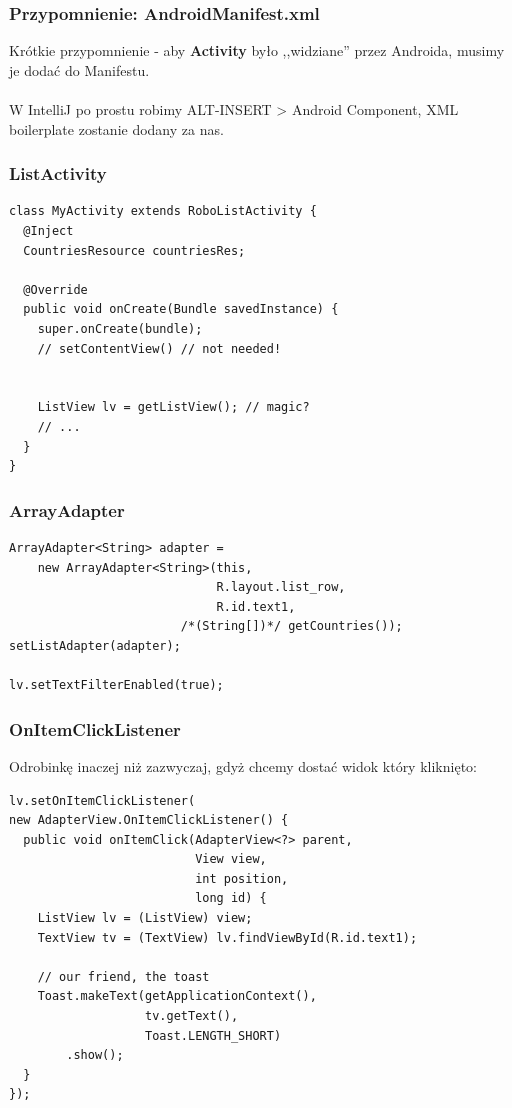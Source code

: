 \documentclass{beamer}
\begin{document}
\begin{frame}\frametitle{Przypomnienie: AndroidManifest.xml}
\begin{center}
Krótkie przypomnienie - aby \textbf{Activity} było ,,widziane'' 
przez Androida, musimy je dodać do Manifestu.
\ \\ 
\ \\ 
\small{W IntelliJ po prostu robimy ALT-INSERT > Android Component, 
XML boilerplate zostanie dodany za nas.}
\end{center}
\end{frame}

\begin{frame}[fragile]\frametitle{ListActivity}
\begin{lstlisting}
class MyActivity extends RoboListActivity {
  @Inject
  CountriesResource countriesRes;
 
  @Override
  public void onCreate(Bundle savedInstance) {
    super.onCreate(bundle);
    // setContentView() // not needed!
    

    ListView lv = getListView(); // magic?
    // ...
  }
}
\end{lstlisting}
\end{frame}

\begin{frame}[fragile]\frametitle{ArrayAdapter}
\begin{lstlisting}
ArrayAdapter<String> adapter = 
    new ArrayAdapter<String>(this, 
                             R.layout.list_row, 
                             R.id.text1, 
                        /*(String[])*/ getCountries());
setListAdapter(adapter);

lv.setTextFilterEnabled(true);
\end{lstlisting}
\end{frame}

\begin{frame}[fragile]\frametitle{\textbf{OnItemClick}Listener}
Odrobinkę inaczej niż zazwyczaj, gdyż chcemy dostać widok który kliknięto:
\begin{lstlisting}
lv.setOnItemClickListener(
new AdapterView.OnItemClickListener() {
  public void onItemClick(AdapterView<?> parent, 
                          View view,
                          int position, 
                          long id) {
    ListView lv = (ListView) view;
    TextView tv = (TextView) lv.findViewById(R.id.text1);

    // our friend, the toast
    Toast.makeText(getApplicationContext(),
                   tv.getText(),
                   Toast.LENGTH_SHORT)
        .show();
  }
});
\end{lstlisting}
\end{frame}
\end{document}
